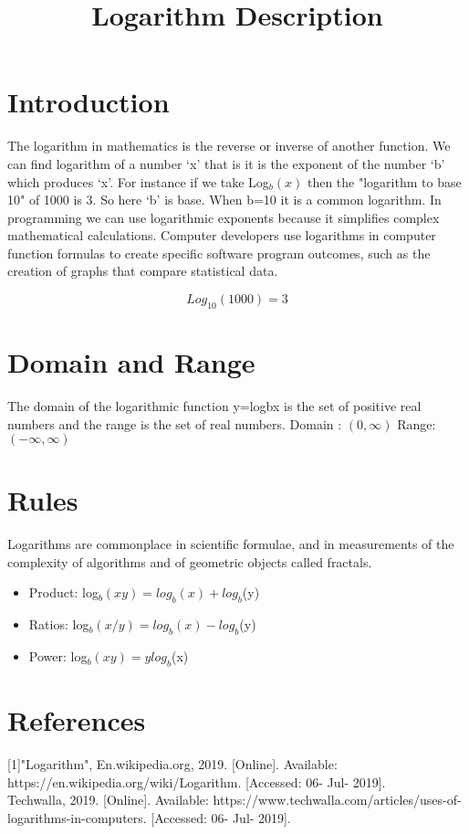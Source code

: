 \documentclass{article}
\title{\textbf {Logarithm Description}}
\begin{document}
\maketitle

\section{Introduction}
The logarithm in mathematics is the reverse or inverse of another function. We can find logarithm of a number ‘x’ that is it is the exponent of the number ‘b’ which produces ‘x’. For instance if we take Log$_{b}(x)$ then the "logarithm to base 10" of 1000 is 3. So here ‘b’ is base. When b=10 it is a common logarithm. In programming we can use logarithmic exponents because it simplifies complex mathematical calculations. Computer developers use logarithms in computer function formulas to create specific software program outcomes, such as the creation of graphs that compare statistical data.


\begin{equation}
Log_{10}(1000)=3
\end{equation}
\section{Domain and Range}
The domain of the logarithmic function y=logbx is the set of positive real numbers and the range is the set of real numbers.
Domain : $(0,\infty)$
Range:  $(-\infty,\infty)$
\section{Rules}
Logarithms are commonplace in scientific formulae, and in measurements of the complexity of algorithms and of geometric objects called fractals. 
\begin{itemize}
\item	Product:			log$_{b}(xy)  = log_{b}(x)+ log_{b}$(y)
\item	Ratios:			log$_{b}(x/y) = log_{b}(x)- log_{b}$(y)
\item	Power:			log$_{b}(xy)   = y log_{b}$(x)
\end{itemize}
\section{References}

 [1]"Logarithm", En.wikipedia.org, 2019. [Online]. Available: https://en.wikipedia.org/wiki/Logarithm. [Accessed: 06- Jul- 2019].\\
 [2] Techwalla, 2019. [Online]. Available: https://www.techwalla.com/articles/uses-of-logarithms-in-computers. [Accessed: 06- Jul- 2019].
\end{document}
